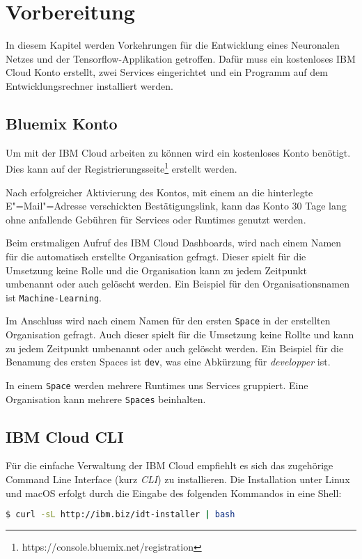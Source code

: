 \section{Vorbereitung}
In diesem Kapitel werden Vorkehrungen für die Entwicklung eines Neuronalen Netzes und der Tensorflow-Applikation
getroffen. Dafür muss ein kostenloses IBM Cloud Konto erstellt, zwei Services eingerichtet und ein Programm auf dem
Entwicklungsrechner installiert werden.

\subsection{Bluemix Konto}
Um mit der IBM Cloud arbeiten zu können wird ein kostenloses Konto benötigt. Dies kann auf der
Registrierungsseite\footnote{https://console.bluemix.net/registration} erstellt werden.

Nach erfolgreicher Aktivierung des Kontos, mit einem an die hinterlegte E"=Mail"=Adresse verschickten Bestätigungslink,
kann das Konto 30 Tage lang ohne anfallende Gebühren für Services oder Runtimes genutzt werden.

Beim erstmaligen Aufruf des IBM Cloud Dashboards, wird nach einem Namen für die automatisch erstellte Organisation
gefragt. Dieser spielt für die Umsetzung keine Rolle und die Organisation kann zu jedem Zeitpunkt umbenannt oder auch
gelöscht werden. Ein Beispiel für den Organisationsnamen ist \texttt{Machine-Learning}.

Im Anschluss wird nach einem Namen für den ersten \texttt{Space} in der erstellten Organisation gefragt. Auch dieser
spielt für die Umsetzung keine Rollte und kann zu jedem Zeitpunkt umbenannt oder auch gelöscht werden. Ein Beispiel für
die Benamung des ersten Spaces ist \texttt{dev}, was eine Abkürzung für \textit{developper} ist.

In einem \texttt{Space} werden mehrere Runtimes uns Services gruppiert. Eine Organisation kann mehrere \texttt{Spaces}
beinhalten.

\subsection{IBM Cloud CLI}
Für die einfache Verwaltung der IBM Cloud empfiehlt es sich das zugehörige Command Line Interface (kurz \textit{CLI}) zu
installieren. Die Installation unter Linux und macOS erfolgt durch die Eingabe des folgenden Kommandos in eine Shell:

\begin{lstlisting}[language=bash, caption=Installation des IBM Cloud CLI, label=Installation des IBM Cloud CLI]
    $ curl -sL http://ibm.biz/idt-installer | bash
\end{lstlisting}


